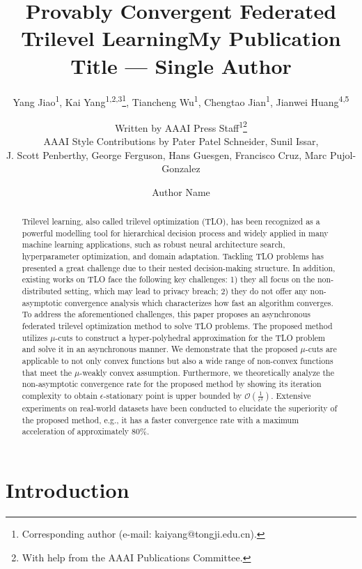 \documentclass[letterpaper]{article} %
\title{Provably Convergent Federated Trilevel Learning}
\author {
    Yang Jiao\textsuperscript{\rm 1},
    Kai Yang\textsuperscript{\rm 1,2,3}\thanks{Corresponding author (e-mail: kaiyang@tongji.edu.cn).},
    Tiancheng Wu\textsuperscript{\rm 1},
    Chengtao Jian\textsuperscript{\rm 1},
    Jianwei Huang\textsuperscript{\rm 4,5}
}
\author{
    Written by AAAI Press Staff\textsuperscript{\rm 1}\thanks{With help from the AAAI Publications Committee.}\\
    AAAI Style Contributions by Pater Patel Schneider,
    Sunil Issar,\\
    J. Scott Penberthy,
    George Ferguson,
    Hans Guesgen,
    Francisco Cruz\equalcontrib,
    Marc Pujol-Gonzalez\equalcontrib
}
\title{My Publication Title --- Single Author}
\author {
    Author Name
}
\begin{document}
\maketitle

\begin{abstract}
Trilevel learning, also called trilevel optimization (TLO), has been recognized as a powerful modelling tool for hierarchical decision process and widely applied in many machine learning applications, such as robust neural architecture search, hyperparameter optimization, and domain adaptation. Tackling TLO problems has presented a great challenge due to their nested decision-making structure. In addition, existing works on TLO face the following key challenges: 1) they all focus on the non-distributed setting, which may lead to privacy breach; 2) they do not offer any non-asymptotic convergence analysis which characterizes how fast an algorithm converges. To address the aforementioned challenges, this paper proposes an asynchronous federated trilevel optimization method to solve TLO problems. The proposed method utilizes $\mu$-cuts to construct a hyper-polyhedral approximation for the TLO problem and solve it in an asynchronous manner. We demonstrate that the proposed $\mu$-cuts are applicable to not only convex functions but also a wide range of non-convex functions that meet the $\mu$-weakly convex assumption. Furthermore, we theoretically analyze the non-asymptotic convergence rate for the proposed method by showing its iteration complexity to obtain $\epsilon$-stationary point is upper bounded by $\mathcal{O}(\frac{1}{\epsilon^2})$. Extensive experiments on real-world datasets have been conducted to elucidate the superiority of the proposed method, e.g., it has a  faster convergence rate with a maximum acceleration of approximately 80$\%$.

\end{abstract}

\section{Introduction}
\end{document}
